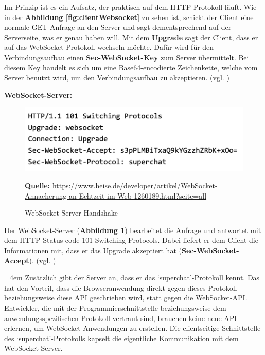 Im Prinzip ist es ein Aufsatz, der praktisch auf dem HTTP-Protokoll läuft. Wie in der \textbf{Abbildung \ref{fig:clientWebsocket}} zu sehen ist, schickt der Client eine normale GET-Anfrage an den Server und sagt dementsprechend auf der Serverseite, was er genau haben will. Mit dem \textbf{Upgrade} sagt der Client, dass er auf das WebSocket-Protokoll wechseln möchte. Dafür wird für den Verbindungsaufbau einen \textbf{Sec-WebSocket-Key} zum Server übermittelt. Bei diesem Key handelt es sich um eine Base64-encodierte Zeichenkette, welche vom Server benutzt wird, um den Verbindungsaufbau zu akzeptieren. (vgl. \cite{Matt2011})\bigskip

\textbf{WebSocket-Server:}

\begin{figure}[H]
  \begin{center}
    \includegraphics[scale=0.6]{img/serverWebsocket}
	\caption{WebSocket-Server Handshake}
	\footnotesize\sffamily\textbf{Quelle:} \url{https://www.heise.de/developer/artikel/WebSocket-Annaeherung-an-Echtzeit-im-Web-1260189.html?seite=all} 
	\label{fig:serverWebsocket}
  \end{center}   
\end{figure}

Der WebSocket-Server (\textbf{Abbildung \ref{fig:serverWebsocket}}) bearbeitet die Anfrage und antwortet mit dem HTTP-Status\- code 101 Switching Protocols. Dabei liefert er dem Client die Informationen mit, dass er das Upgrade akzeptiert hat (\textbf{Sec-WebSocket-Accept}). (vgl. \cite{Matt2011})

\newpage
\par
\begingroup
\leftskip=4em %
\rightskip\leftskip
\noindent \glqq Zusätzlich gibt der Server an, dass er das ‘superchat’-Protokoll kennt. Das hat den Vorteil, dass die Browseranwendung direkt gegen dieses Protokoll beziehungsweise diese API geschrieben wird, statt gegen die WebSocket-API. Entwickler, die mit der Programmierschnittstelle beziehungsweise dem anwendungsspezifischen Protokoll vertraut sind, brauchen keine neue API erlernen, um WebSocket-Anwendungen zu erstellen. Die clientseitige Schnittstelle des ‘superchat’-Protokolls kapselt die eigentliche Kommunikation mit dem WebSocket-Server.\grqq{} \cite{Matt2011}
\par
\endgroup

